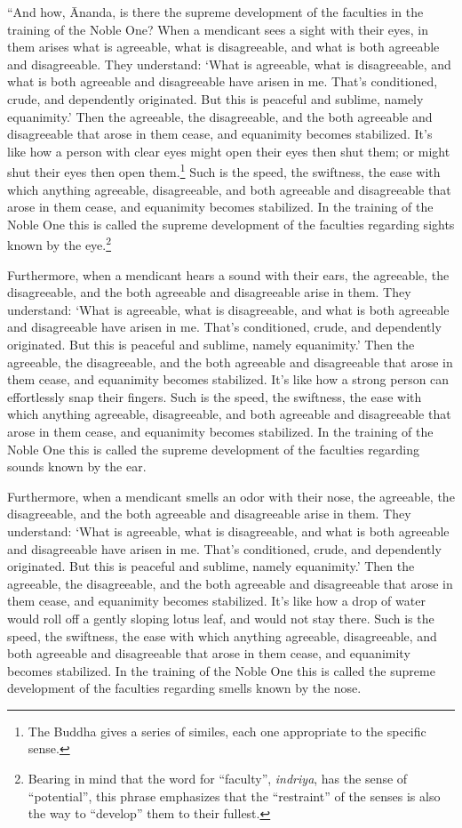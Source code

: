 \documentclass[12pt,openany]{book}%
\begin{document}
“And how, Ānanda, is there the supreme development of the faculties in the training of the Noble One? When a mendicant sees a sight with their eyes, in them arises what is agreeable, what is disagreeable, and what is both agreeable and disagreeable. They understand: ‘What is agreeable, what is disagreeable, and what is both agreeable and disagreeable have arisen in me. That’s conditioned, crude, and dependently originated. But this is peaceful and sublime, namely equanimity.’ Then the agreeable, the disagreeable, and the both agreeable and disagreeable that arose in them cease, and equanimity becomes stabilized. It’s like how a person with clear eyes might open their eyes then shut them; or might shut their eyes then open them.\footnote{The Buddha gives a series of similes, each one appropriate to the specific sense. } Such is the speed, the swiftness, the ease with which anything agreeable, disagreeable, and both agreeable and disagreeable that arose in them cease, and equanimity becomes stabilized. In the training of the Noble One this is called the supreme development of the faculties regarding sights known by the eye.\footnote{Bearing in mind that the word for “faculty”, \textit{indriya}, has the sense of “potential”, this phrase emphasizes that the “restraint” of the senses is also the way to “develop” them to their fullest. } 

Furthermore, when a mendicant hears a sound with their ears, the agreeable, the disagreeable, and the both agreeable and disagreeable arise in them. They understand: ‘What is agreeable, what is disagreeable, and what is both agreeable and disagreeable have arisen in me. That’s conditioned, crude, and dependently originated. But this is peaceful and sublime, namely equanimity.’ Then the agreeable, the disagreeable, and the both agreeable and disagreeable that arose in them cease, and equanimity becomes stabilized. It’s like how a strong person can effortlessly snap their fingers. Such is the speed, the swiftness, the ease with which anything agreeable, disagreeable, and both agreeable and disagreeable that arose in them cease, and equanimity becomes stabilized. In the training of the Noble One this is called the supreme development of the faculties regarding sounds known by the ear. 

Furthermore, when a mendicant smells an odor with their nose, the agreeable, the disagreeable, and the both agreeable and disagreeable arise in them. They understand: ‘What is agreeable, what is disagreeable, and what is both agreeable and disagreeable have arisen in me. That’s conditioned, crude, and dependently originated. But this is peaceful and sublime, namely equanimity.’ Then the agreeable, the disagreeable, and the both agreeable and disagreeable that arose in them cease, and equanimity becomes stabilized. It’s like how a drop of water would roll off a gently sloping lotus leaf, and would not stay there. Such is the speed, the swiftness, the ease with which anything agreeable, disagreeable, and both agreeable and disagreeable that arose in them cease, and equanimity becomes stabilized. In the training of the Noble One this is called the supreme development of the faculties regarding smells known by the nose. 
\end{document}
